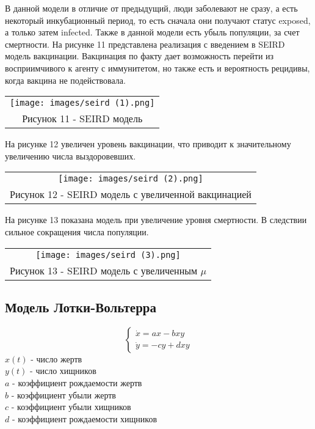 В данной модели в отличие от предыдущий, люди заболевают не сразу, а есть некоторый инкубационный период, то есть сначала они получают статус exposed, а только затем infected. Также в данной модели есть убыль популяции, за счет смертности. На рисунке 11 представлена реализация с введением в SEIRD модель вакцинации. Вакцинация по факту дает возможность перейти из восприимчивого к агенту с иммунитетом, но также есть и вероятность рецидивы, когда вакцина не подействовала.
\begin{center}
  \begin{tabular}{c}
    \texttt{[image: images/seird (1).png]}\\
    Рисунок 11 - SEIRD модель
  \end{tabular}
\end{center}

На рисунке 12 увеличен уровень вакцинации, что приводит к значительному увеличению числа выздоровевших.
\begin{center}
  \begin{tabular}{c}
    \texttt{[image: images/seird (2).png]}\\
    Рисунок 12 - SEIRD модель с увеличенной вакцинацией
  \end{tabular}
\end{center}

На рисунке 13 показана модель при увеличение уровня смертности. В следствии сильное сокращения числа популяции.
\begin{center}
  \begin{tabular}{c}
    \texttt{[image: images/seird (3).png]}\\
    Рисунок 13 - SEIRD модель с увеличенным $\mu$
  \end{tabular}
\end{center}

\subsection{Модель Лотки-Вольтерра}
\begin{equation}
  \begin{cases}
    \dot{x}=ax-bxy\\
    \dot{y}=-cy+dxy
  \end{cases}
\end{equation}
$x(t)$ - число жертв\\
$y(t)$ - число хищников\\
$a$ - коэффициент рождаемости жертв\\
$b$ - коэффициент убыли жертв\\
$c$ - коэффициент убыли хищников \\
$d$ - коэффициент рождаемости хищников\\

